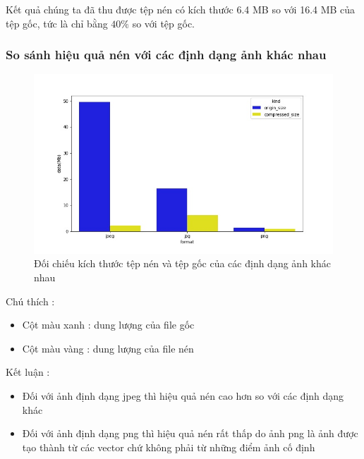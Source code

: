 Kết quả chúng ta đã thu được tệp nén có kích thước 6.4 MB so với 16.4 MB của tệp gốc, tức là chỉ bằng $40\%$ so với tệp gốc.
\newpage
\subsubsection{So sánh hiệu quả nén với các định dạng ảnh khác nhau}
\begin{center}
    \begin{figure}[htp]
        \begin{center}
            \includegraphics[width=\textwidth,height=\textheight,keepaspectratio]{Chapters/07_DimemsionalityReduction/27_pca/barplot.jpg}
        \end{center}
        \caption{Đối chiếu kích thước tệp nén và tệp gốc của các định dạng ảnh khác nhau}
        \label{fig:27_11}
    \end{figure}
\end{center}

Chú thích :
\begin{itemize}
    \item Cột màu xanh : dung lượng của file gốc
    \item Cột màu vàng : dung lượng của file nén
\end{itemize}

Kết luận :
\begin{itemize}
    \item Đối với ảnh định dạng jpeg thì hiệu quả nén cao hơn so với các định dạng khác
    \item Đối với ảnh định dạng png thì hiệu quả nén rất thấp do ảnh png là ảnh được tạo thành từ các vector chứ không phải từ những điểm ảnh cố định
\end{itemize}


% 
% 




